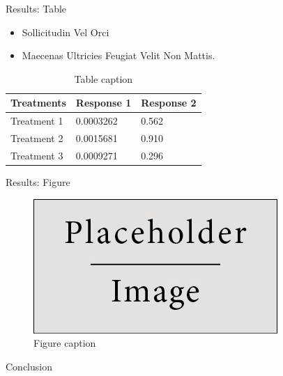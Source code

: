 \documentclass[final,hyperref={pdfpagelabels=false}]{beamer}
\begin{document}
\begin{frame}[t]
\begin{columns}[t]
\begin{column}{.465\textwidth}
\begin{block}{Results: Table}
\begin{itemize}
\item Sollicitudin Vel Orci
\item Maecenas Ultricies Feugiat Velit Non Mattis.
\end{itemize}

\begin{table}
\begin{tabular}{l l l}
\toprule
\textbf{Treatments} & \textbf{Response 1} & \textbf{Response 2}\\
\midrule
Treatment 1 & 0.0003262 & 0.562 \\
Treatment 2 & 0.0015681 & 0.910 \\
Treatment 3 & 0.0009271 & 0.296 \\
\bottomrule
\end{tabular}
\caption{Table caption}
\end{table}
     
\end{block}


\begin{block}{Results: Figure}

\begin{figure}
\includegraphics[width=0.8\linewidth]{placeholder.jpg}
\caption{Figure caption}
\end{figure}

\end{block}


\begin{block}{Conclusion}


\end{block}
\end{column}
\end{columns}
\end{frame}
\end{document}
